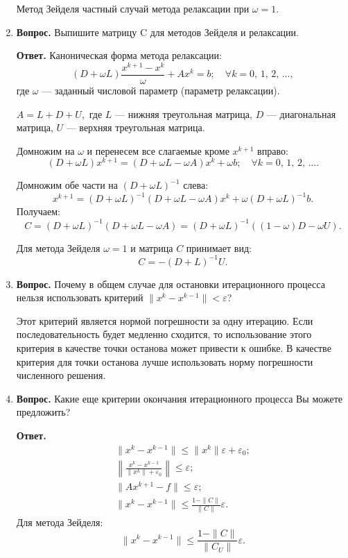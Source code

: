 \documentclass[12pt, a4paper]{article}
\begin{document}
\begin{enumerate}
  Метод Зейделя частный случай метода релаксации при $ \omega = 1 $.
  
  	\item  \textbf{Вопрос.}	Выпишите матрицу C для методов Зейделя и релаксации.
  	
  \textbf{Ответ.}	Каноническая форма метода релаксации:
  	$$	\left( D + \omega L \right) \frac{x^{k + 1} - x^k}{\omega} + A x^k = b;\quad \forall k = 0,\, 1,\, 2,\, \dots,$$ где $\omega$ --- заданный числовой параметр (параметр релаксации).
  	
  	 $ A = L + D + U,$ где $L$ --- нижняя треугольная матрица, $D$ --- диагональная матрица, $U$ --- верхняя треугольная матрица.
  	
  	Домножим на $\omega$ и перенесем все слагаемые кроме $x^{k + 1}$ вправо:
  	$$\left( D + \omega L \right)x^{k + 1} = \left( D + \omega L -\omega A \right)x^k +\omega b; \quad \forall k = 0,\, 1,\, 2,\, \dots. $$
  	
  	Домножим обе части на $ \left( D + \omega L \right)^{-1}$ слева:
  		$$x^{k + 1} = \left( D + \omega L \right)^{-1} \left( D + \omega L -\omega A \right)x^k +\omega \left( D + \omega L \right)^{-1} b. $$
  	Получаем:
  	$$ C = \left( D + \omega L \right)^{-1} \left( D + \omega L -\omega A \right) = \left( D + \omega L \right)^{-1} \left( \left( 1 - \omega \right) D  -\omega U \right).  $$
  	
  	Для метода Зейделя $\omega = 1$ и матрица $C$ принимает вид:
  	$$ C = - \left( D + L \right)^{-1}U.  $$ 
  	
 	\item  \textbf{Вопрос.} Почему в общем случае для остановки итерационного процесса нельзя использовать критерий $\| x^k - x^{k-1} \| < \varepsilon$?
 	
 	Этот критерий является нормой погрешности за одну итерацию. Если последовательность будет медленно сходится, то использование этого критерия в качестве точки останова может привести к ошибке. В качестве критерия для точки останова лучше использовать норму погрешности численного решения.
 	
 	\item  \textbf{Вопрос.} Какие еще критерии окончания итерационного процесса Вы можете предложить?
 	
 	 \textbf{Ответ.}
 	\begin{gather*}
 		\| x^k - x^{k - 1} \| \leq \| x^k\| \varepsilon + \varepsilon_0; \\
 		\left\| \frac{ x^k - x^{k - 1}}{\| x^k \| + \varepsilon_0} \right\| \leq \varepsilon; \\
 		 		\| A x^{k + 1} - f \| \leq \varepsilon; \\
 		\| x^k - x^{k - 1}\| \leq \frac{1 - \| C \|}{\| C \|} \varepsilon. 
 	\end{gather*}
 	Для метода Зейделя:
 	$$\| x^k - x^{k - 1} \| \leq \frac{1-\| C \|}{\| C_U \|} \varepsilon.$$
 	
  	
  	
		\end{enumerate}

	
\end{document}
